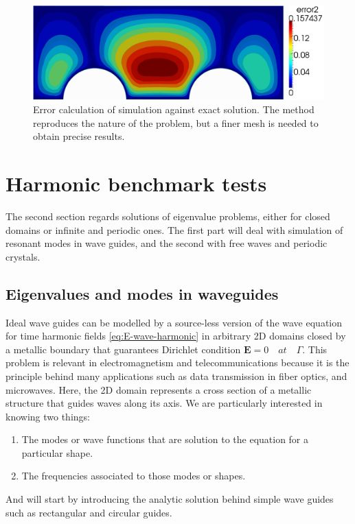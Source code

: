 \begin{figure}
\centering
\includegraphics[scale=0.4]{./img/two_cylinders_error.pdf}
\caption{Error calculation of simulation against exact solution. The method reproduces the nature of the problem, but a finer mesh is needed to obtain precise results.}
\label{fig:two_cylinders_error}
\end{figure}

\section{Harmonic benchmark tests}
The second section regards solutions of eigenvalue problems, either for closed domains or infinite and periodic ones. The first part will deal with simulation of resonant modes in wave guides, and the second with free waves and periodic crystals.

\subsection{Eigenvalues and modes in waveguides}

Ideal wave guides can be modelled by a source-less version of the wave equation for time harmonic fields \ref{eq:E-wave-harmonic} in arbitrary 2D domains closed by a metallic boundary that guarantees Dirichlet condition $\mathbf{E} = 0\quad at\quad \Gamma$. This problem is relevant in electromagnetism and telecommunications because it is the principle behind many applications such as data transmission in fiber optics, and microwaves. Here, the 2D domain represents a cross section of a metallic structure that guides waves along its axis. We are particularly interested in knowing two things:
\begin{enumerate}
\item The modes or wave functions that are solution to the equation for a particular shape.
\item The frequencies associated to those modes or shapes. 
\end{enumerate}
And will start by introducing the analytic solution behind simple wave guides such as rectangular and circular guides.

